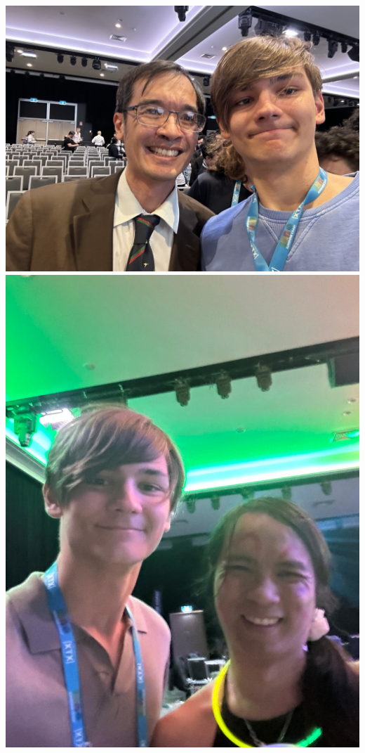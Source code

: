 \documentclass{article}
\begin{document}
\begin{center}
  \includegraphics[scale=0.15]{assets/terence.jpg}
  \includegraphics[scale=0.1]{assets/evan-chen.jpeg}
\end{center}
\end{document}
